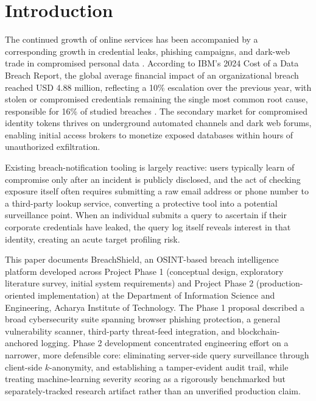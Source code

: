 \documentclass[conference]{IEEEtran}
\begin{document}
\section{Introduction}
The continued growth of online services has been accompanied by a corresponding growth in credential leaks, phishing campaigns, and dark-web trade in compromised personal data \cite{aljofey2020effective}. According to IBM's 2024 Cost of a Data Breach Report, the global average financial impact of an organizational breach reached USD 4.88 million, reflecting a 10\% escalation over the previous year, with stolen or compromised credentials remaining the single most common root cause, responsible for 16\% of studied breaches \cite{ibm2024cost}. The secondary market for compromised identity tokens thrives on underground automated channels and dark web forums, enabling initial access brokers to monetize exposed databases within hours of unauthorized exfiltration.

Existing breach-notification tooling is largely reactive: users typically learn of compromise only after an incident is publicly disclosed, and the act of checking exposure itself often requires submitting a raw email address or phone number to a third-party lookup service, converting a protective tool into a potential surveillance point. When an individual submits a query to ascertain if their corporate credentials have leaked, the query log itself reveals interest in that identity, creating an acute target profiling risk.

This paper documents BreachShield, an OSINT-based breach intelligence platform developed across Project Phase 1 (conceptual design, exploratory literature survey, initial system requirements) and Project Phase 2 (production-oriented implementation) at the Department of Information Science and Engineering, Acharya Institute of Technology. The Phase 1 proposal described a broad cybersecurity suite spanning browser phishing protection, a general vulnerability scanner, third-party threat-feed integration, and blockchain-anchored logging. Phase 2 development concentrated engineering effort on a narrower, more defensible core: eliminating server-side query surveillance through client-side $k$-anonymity, and establishing a tamper-evident audit trail, while treating machine-learning severity scoring as a rigorously benchmarked but separately-tracked research artifact rather than an unverified production claim.
\end{document}
